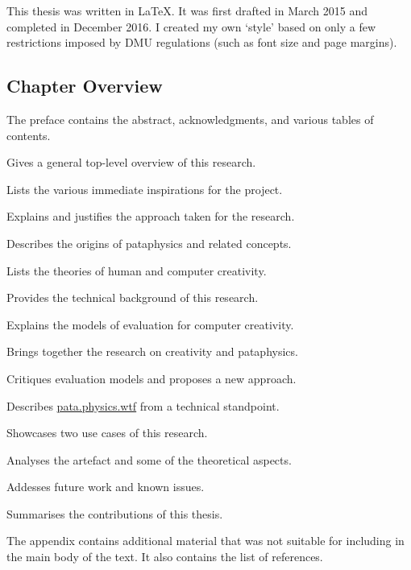This thesis was written in \LaTeX. It was first drafted in March 2015 and completed in December 2016. I created my own `style' based on only a few restrictions imposed by \ac{DMU} regulations (such as font size and page margins).


\subsection{Chapter Overview}

The preface contains the abstract, acknowledgments, and various tables of contents.

\begin{description}[leftmargin=3.5cm]
  \item[Introduction] Gives a general top-level overview of this research.
  \item[Inspirations] Lists the various immediate inspirations for the project.
  \item[Methodology] Explains and justifies the approach taken for the research.
  \item[Pataphysics] Describes the origins of pataphysics and related concepts. 
  \item[Creativity] Lists the theories of human and computer creativity.
  \item[Technology] Provides the technical background of this research.
  \item[Evaluation] Explains the models of evaluation for computer creativity.
  \item[Foundations] Brings together the research on creativity and pataphysics.
  \item[Interpretation] Critiques evaluation models and proposes a new approach.
  \item[Implementation] Describes \url{pata.physics.wtf} from a technical standpoint.
  \item[Applications] Showcases two use cases of this research.
  \item[Patanalysis] Analyses the artefact and some of the theoretical aspects. 
  \item[Asprirations] Addesses future work and known issues.
  \item[Outroduction] Summarises the contributions of this thesis.
\end{description}

The appendix contains additional material that was not suitable for including in the main body of the text. It also contains the list of references.


\stopcontents[chapters]
